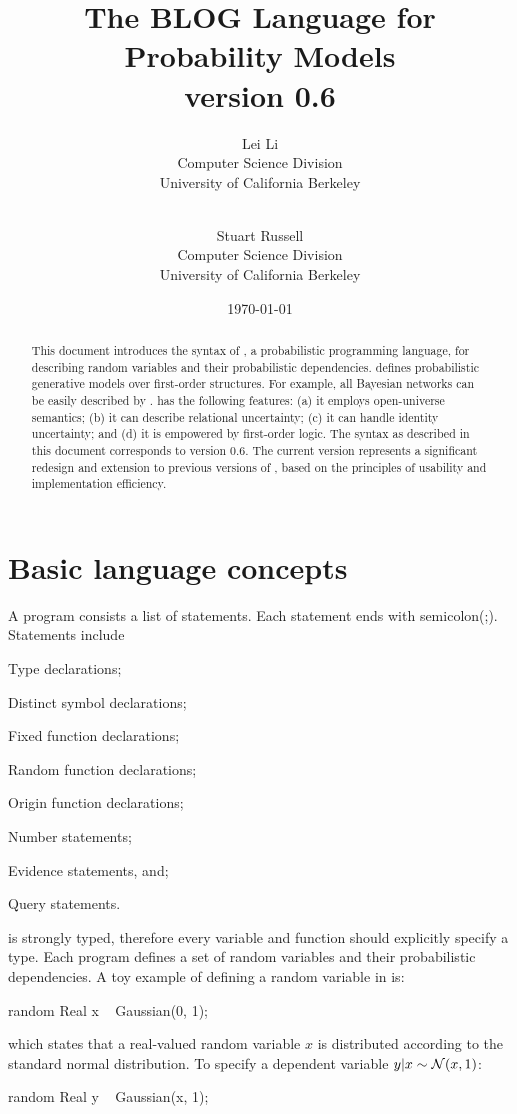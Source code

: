 \documentclass[12pt]{article}
\title{The BLOG Language for Probability Models\\ {version 0.6}}
\author{Lei Li\\
              Computer Science Division\\
              University of California Berkeley\\
               \email{leili@cs.berkeley.edu}\\
\and
               Stuart Russell\\
              Computer Science Division\\
              University of California Berkeley\\
               \email{russell@cs.berkeley.edu}
               }
\date{\today}
\begin{document}
\maketitle


\begin{abstract}
This document introduces the syntax of \bl, a probabilistic programming language, for describing random variables and their probabilistic dependencies.  
\bl defines probabilistic generative models over first-order structures. For example, all Bayesian networks can be easily described by \bl.  
\bl has the following features: 
(a) it employs open-universe semantics;
(b) it can describe relational uncertainty;
(c) it can handle identity uncertainty; and
(d) it is empowered by first-order logic.
The syntax as described in this document corresponds to \bl version 0.6. The current version represents a significant redesign and extension to previous versions of \bl, based on the principles of usability and implementation efficiency.
\end{abstract}


\tableofcontents


\section{Basic language concepts}
A \bl program consists a list of statements.
Each statement ends with semicolon(;). 
Statements include 
\begin{enumerate*}
\item Type declarations; 
\item Distinct symbol declarations;
\item Fixed function declarations;
\item Random function declarations;
\item Origin function declarations;
\item Number statements;
\item Evidence statements, and;
\item Query statements.
\end{enumerate*}

\bl is strongly typed, therefore every variable and function should explicitly specify a type.
Each \bl program defines a set of random variables and their probabilistic dependencies. 
A toy example of defining a random variable in \bl is:

\begin{blogcode}
random Real x ~ Gaussian(0, 1);
\end{blogcode}
which states that a real-valued random variable $x$ is distributed according to the standard normal distribution. 
To specify a dependent variable $y | x \sim \mathcal{N}(x, 1)$:
\begin{blogcode}
random Real y ~ Gaussian(x, 1);
\end{blogcode}
\end{document}
